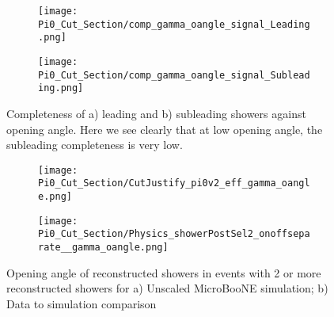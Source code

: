 \begin{figure}[H]
\centering
  \begin{subfigure}[t]{0.35\textwidth}
    \centering
\texttt{[image: Pi0\_Cut\_Section/comp\_gamma\_oangle\_signal\_Leading.png]}
  \caption{ }
  \end{subfigure} 
  \hspace{20mm}
  \begin{subfigure}[t]{0.35\textwidth}
    \centering
    \texttt{[image: Pi0\_Cut\_Section/comp\_gamma\_oangle\_signal\_Subleading.png]}
  \caption{ }
  \end{subfigure} 
\caption{ Completeness of a) leading and b) subleading showers against opening angle. Here we see clearly that at low opening angle, the subleading completeness is very low. }
\label{fig:comp_cutjust_pi0_OA}
\end{figure}

\begin{figure}[H]
\centering
  \begin{subfigure}[t]{0.35\textwidth}
    \centering
\texttt{[image: Pi0\_Cut\_Section/CutJustify\_pi0v2\_eff\_gamma\_oangle.png]}
  \caption{ }
  \end{subfigure} 
  \hspace{20mm}
  \begin{subfigure}[t]{0.35\textwidth}
    \centering
    \texttt{[image: Pi0\_Cut\_Section/Physics\_showerPostSel2\_onoffseparate\_\_gamma\_oangle.png]}
  \caption{ }
  \end{subfigure} 
\caption{ Opening angle of reconstructed showers in events with 2 or more reconstructed showers for a) Unscaled MicroBooNE simulation; b) Data to simulation comparison }
\label{fig:cutjust_pi0_OA}
\end{figure}


